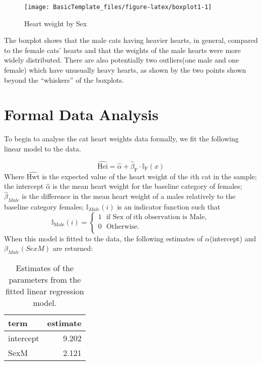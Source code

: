 \documentclass[
]{article}
\begin{document}
\begin{figure}[H]

{\centering \texttt{[image: BasicTemplate\_files/figure-latex/boxplot1-1]} 

}

\caption{\label{fig:box} Heart weight by Sex}\label{fig:boxplot1}
\end{figure}

The boxplot shows that the male cats having heavier hearts, in general,
compared to the female cats' hearts and that the weights of the male
hearts were more widely distributed. There are also potentially two
outliers(one male and one female) which have unusually heavy hearts, as
shown by the two points shown beyond the ``whiskers'' of the boxplots.

\hypertarget{sec:FDA}{%
\section{Formal Data Analysis}\label{sec:FDA}}

To begin to analyse the cat heart weights data formally, we fit the
following linear model to the data.

\[\widehat{\mbox{Hei}} = \widehat{\alpha} + \widehat{\beta}_{\mbox{F}} \cdot \mathbb{I}_{\mbox{F}}(x)\]
Where \(\widehat{\mbox{Hwt}}\) is the expected value of the heart weight
of the \(i\)th cat in the sample; the intercept \(\widehat{\alpha}\) is
the mean heart weight for the baseline category of females;
\(\widehat{\beta}_{Male}\) is the difference in the mean heart weight of
a males relatively to the baseline category females;
\(\mathbb{I}_{Male}(i)\) is an indicator function such that
\[\mathbb{I}_{\mbox{Male}}(i)=\left\{
\begin{array}{ll}
1 ~~~ \mbox{if Sex of} ~ i \mbox{th observation is Male},\\
0 ~~~ \mbox{Otherwise}.\\
\end{array}
\right.\] When this model is fitted to the data, the following estimates
of \(\alpha\)(intercept) and \(\beta_{Male}(SexM)\) are returned:

\begin{table}[!h]

\caption{\label{tab:modeltable}\label{tab:reg} Estimates of the parameters from the fitted linear regression model.}
\centering
\begin{tabular}[t]{l|r}
\hline
term & estimate\\
\hline
intercept & 9.202\\
\hline
SexM & 2.121\\
\hline
\end{tabular}
\end{table}
\end{document}

